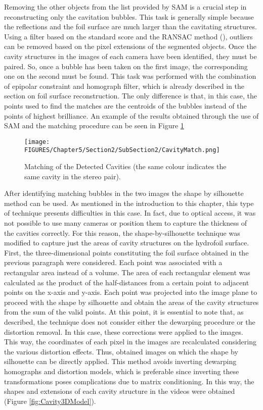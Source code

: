 Removing the other objects from the list provided by SAM is a crucial step in reconstructing only the cavitation bubbles.
This task is generally simple because the reflections and the foil surface are much larger than the cavitating structures. Using a filter based on the standard score and the RANSAC method (\cite{Fischler1981}), outliers can be removed based on the pixel extensions of the segmented objects. 
Once the cavity structures in the images of each camera have been identified, they must be paired. So, once a bubble has been taken on the first image, the corresponding one on the second must be found. This task was performed with the combination of epipolar constraint and homograph filter, which is already described in the section on foil surface reconstruction. The only difference is that, in this case, the points used to find the matches are the centroids of the bubbles instead of the points of highest brilliance. An example of the results obtained through the use of SAM and the matching procedure can be seen in Figure \ref{fig:CavityMatch}

\begin{figure}[htbp]
    \centering
    \texttt{[image: FIGURES/Chapter5/Section2/SubSection2/CavityMatch.png]}
    \caption{Matching of the Detected Cavities (the same colour indicates the same cavity in the stereo pair).}
    \label{fig:CavityMatch}
\end{figure}

After identifying matching bubbles in the two images the shape by silhouette method can be used.
As mentioned in the introduction to this chapter, this type of technique presents difficulties in this case. In fact, due to optical access, it was not possible to use many cameras or position them to capture the thickness of the cavities correctly.
For this reason, the shape-by-silhouette technique was modified to capture just the areas of cavity structures on the hydrofoil surface.
First, the three-dimensional points constituting the foil surface obtained in the previous paragraph were considered. Each point was associated with a rectangular area instead of a volume. The area of each rectangular element was calculated as the product of the half-distances from a certain point to adjacent points on the x-axis and y-axis.
Each point was projected into the image plane to proceed with the shape by silhouette and obtain the areas of the cavity structures from the sum of the valid points.
At this point, it is essential to note that, as described, the technique does not consider either the dewarping procedure or the distortion removal.
In this case, these corrections were applied to the images. This way, the coordinates of each pixel in the images are recalculated considering the various distortion effects. Thus, obtained images on which the shape by silhouette can be directly applied.
This method avoids inverting dewarping homographs and distortion models, which is preferable since inverting these transformations poses complications due to matrix conditioning.
In this way, the shapes and extensions of each cavity structure in the videos were obtained (Figure \ref{fig:Cavity3DModel}). 

